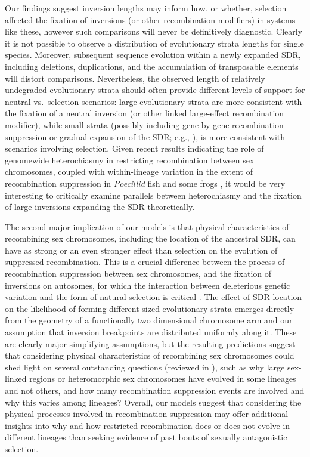 \documentclass{article}
\begin{document}
Our findings suggest inversion lengths may inform how, or whether, selection affected the fixation of inversions (or other recombination modifiers) in  systems like these, however such comparisons will never be definitively diagnostic. Clearly it is not possible to observe a distribution of evolutionary strata lengths for single species. Moreover, subsequent sequence evolution within a newly expanded SDR, including deletions, duplications, and the accumulation of transposable elements will distort comparisons. Nevertheless, the observed length of relatively undegraded evolutionary strata should often provide different levels of support for neutral vs.~selection scenarios: large evolutionary strata are more consistent with the fixation of a neutral inversion (or other linked large-effect recombination modifier), while small strata (possibly including gene-by-gene recombination suppression or gradual expansion of the SDR; e.g., \citealt{BergeroQiuCharlesworth2013, QiuBergeroCharlesworth2015}), is more consistent with scenarios involving selection. Given recent results indicating the role of genomewide heterochiasmy in restricting recombination between sex chromosomes, coupled with within-lineage variation in the extent of recombination suppression in {\itshape Poecillid} fish and some frogs \citep[e.g.,][]{Wright2017,BergeroCharlesworth2019,DaroltiWrightMank2019,FurmanEvans2018}, it would be very interesting to critically examine parallels between heterochiasmy and the fixation of large inversions expanding the SDR theoretically.

The second major implication of our models is that physical characteristics of recombining sex chromosomes, including the location of the ancestral SDR, can have as strong or an even stronger effect than selection on the evolution of suppressed recombination. This is a crucial difference between the process of recombination suppression between sex chromosomes, and the fixation of inversions on autosomes, for which the interaction between deleterious genetic variation and the form of natural selection is critical \citep{ConnallonOlito2020}. The effect of SDR location on the likelihood of forming different sized evolutionary strata emerges directly from the geometry of a functionally two dimensional chromosome arm and our assumption that inversion breakpoints are distributed uniformly along it. These are clearly major simplifying assumptions, but the resulting predictions suggest that considering physical characteristics of recombining sex chromosomes could shed light on several outstanding questions (reviewed in \citealt{Charlesworth2016, Charlesworth2017}), such as why large sex-linked regions or heteromorphic sex chromosomes have evolved in some lineages and not others, and how many recombination suppression events are involved and why this varies among lineages? Overall, our models suggest that considering the physical processes involved in recombination suppression may offer additional insights into why and how restricted recombination does or does not evolve in different lineages than seeking evidence of past bouts of sexually antagonistic selection.
\end{document}
